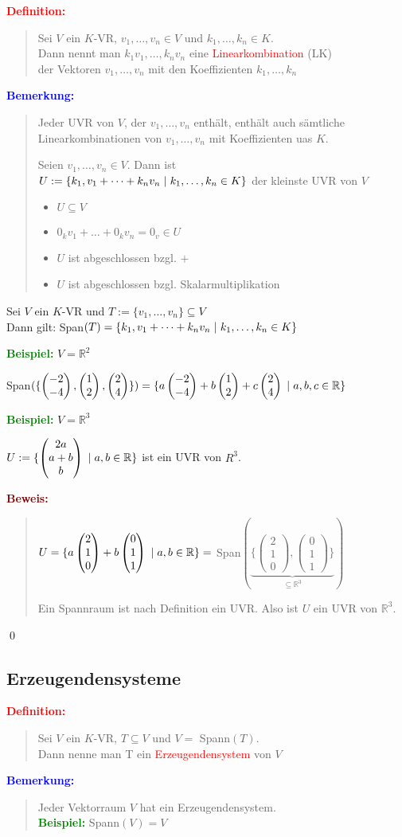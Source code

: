 \documentclass{article}
\newcommand{\smsp}{\phantom{\hspace{3px}}}
\newcommand{\red}[1]{\textcolor{red}{#1}}
\newcommand{\blue}[1]{\textcolor{blue}{#1}}
\newcommand{\green}[1]{\textcolor{green}{#1}}
\newcommand{\maroon}[1]{\textcolor{maroon}{#1}}
\newcommand{\ex}{\green{\textbf{Beispiel: }}}
\newcommand{\de}[1]{\red{\textbf{Definition: }}\begin{quote}#1\end{quote}}
\newcommand{\an}[1]{\blue{\textbf{Bemerkung: }}\begin{quote}#1\end{quote}}
\newcommand{\pr}[1]{\maroon{\textbf{Beweis: }}\begin{quote}#1\end{quote}\qed}
\newcommand{\R}{\mathbb{R}}
\renewcommand{\st}{\smsp | \smsp}
\newcommand{\vvec}[2]{\begin{pmatrix}#1\\#2\end{pmatrix}}
\newcommand{\vvvec}[3]{\begin{pmatrix}#1\\#2\\#3\end{pmatrix}}
\begin{document}
\de{
    Sei $V$ ein $K$-VR, $v_1,\dots,v_n \in V$ und $k_1, \dots, k_n \in K$.\\
    Dann nennt man $k_1v_1, \dots, k_nv_n$ eine \red{Linearkombination} (LK)\\
    der Vektoren $v_1, \dots, v_n$ mit den Koeffizienten $k_1, \dots, k_n$
}
\an{
    Jeder UVR von $V$, der $v_1, \dots, v_n$ enthält, enthält auch sämtliche Linearkombinationen von $v_1, \dots, v_n$ mit Koeffizienten uas $K$.

    Seien $v_1, \dots, v_n \in V$. Dann ist\\
    $U := \{k_1,v_1 + \dots + k_nv_n \st k_1, \dots, k_n \in K\}$ der kleinste UVR von $V$
    \begin{itemize}
        \item $U \subseteq V$
        \item $0_kv_1 + \dots + 0_kv_n = 0_v \in U$
        \item $U$ ist abgeschlossen bzgl. $+$
        \item $U$ ist abgeschlossen bzgl. Skalarmultiplikation
    \end{itemize}
}

Sei $V$ ein $K$-VR und $T := \{v_1, \dots, v_n\} \subseteq V$\\
Dann gilt: Span$(T) = \{k_1, v_1 + \dots + k_nv_n \st k_1, \dots, k_n \in K\}$

\ex $V = \R^2$

Span$(\{\vvec{-2}{-4}, \vvec{1}{2}, \vvec{2}{4}\}) = \{a \vvec{-2}{-4} + b \vvec{1}{2} + c \vvec{2}{4} \st a,b,c \in \R\}$

\newpage
\ex $V = \R^3$

$U := \{\vvvec{2a}{a+b}{b} \st a,b \in \R\}$ ist ein UVR von $R^3$.

\pr{
    $U = \{a \vvvec{2}{1}{0} + b \vvvec{0}{1}{1} \st a,b \in \R\} =$ Span$(\underbrace{\{\vvvec{2}{1}{0}, \vvvec{0}{1}{1}\}}_{\subseteq \R^3})$

    Ein Spannraum ist nach Definition ein UVR. Also ist $U$ ein UVR von $\R^3$.
}

\subsection{Erzeugendensysteme}

\de{
    Sei $V$ ein $K$-VR, $T \subseteq V$ und $V =$ Spann$(T)$.\\
    Dann nenne man T ein \red{Erzeugendensystem} von $V$
}

\an{
    Jeder Vektorraum $V$ hat ein Erzeugendensystem.\\
    \ex Spann$(V) = V$
}
\end{document}
